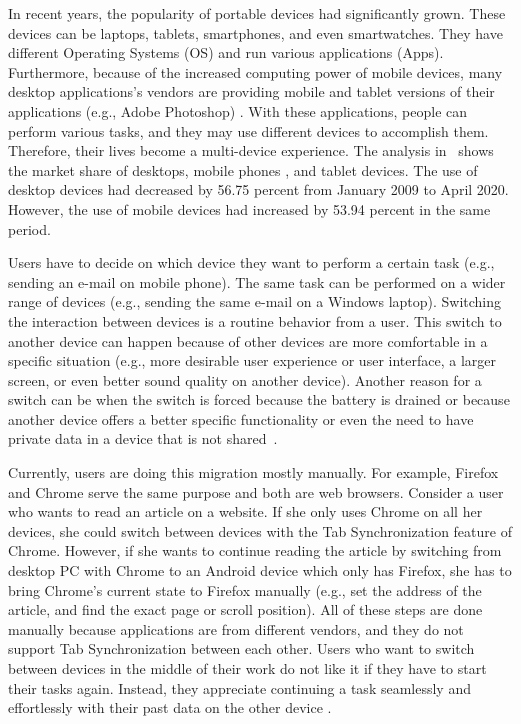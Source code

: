 In recent years, the popularity of portable devices had significantly grown.
These devices can be laptops, tablets, smartphones, and even smartwatches.
They have different Operating Systems (OS) and run various applications (Apps). Furthermore, because of the increased computing power of mobile devices, many desktop applications’s vendors are providing mobile and tablet versions of their applications (e.g., Adobe Photoshop) \cite{cross-platform-appropriate-approach}.
With these applications, people can perform various tasks, and they may use different devices to accomplish them.
Therefore, their lives become a multi-device experience.
The analysis in~\cite{device-market-share} shows the market share of desktops, mobile phones , and tablet devices.
The use of desktop devices had decreased by 56.75 percent from January 2009 to April 2020. 
However, the use of mobile devices had increased by 53.94 percent in the same period.


Users have to decide on which device they want to perform a certain task (e.g., sending an e-mail on mobile phone).
The same task can be performed on a wider range of devices (e.g., sending the same e-mail on a Windows laptop).
Switching the interaction between devices is a routine behavior from a user.
This switch to another device can happen because of other devices are more comfortable in a specific situation (e.g., more desirable user experience or user interface, a larger screen, or even better sound quality on another device).
Another reason for a switch can be when the switch is forced because the battery is drained or because another device offers a better specific functionality or even the need to have private data in a device that is not shared~\cite{migratory-interactive}.


Currently, users are doing this migration mostly manually.
For example, Firefox and Chrome serve the same purpose and both are web browsers. %
Consider a user who wants to read an article on a website. If she only uses Chrome on all her devices, she could switch between devices with the Tab Synchronization feature of Chrome. However, if she wants to continue reading the article by switching from desktop PC with Chrome to an Android device which only has Firefox, she has to bring Chrome's current state to Firefox manually (e.g., set the address of the article, and find the exact page or scroll position). All of these steps are done manually because applications are from different vendors, and they do not support Tab Synchronization between each other.
Users who want to switch between devices in the middle of their work do not like it if they have to start their tasks again. Instead, they appreciate continuing a task seamlessly and effortlessly with their past data on the other device \cite{liquid-software, diary-study}.

